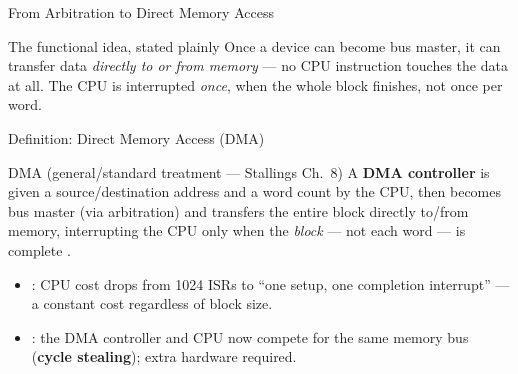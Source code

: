 \documentclass[aspectratio=169]{beamer}
\begin{document}
\begin{frame}{From Arbitration to Direct Memory Access}
  \begin{block}{The functional idea, stated plainly}
    Once a device can become bus master, it can transfer data \emph{directly
    to or from memory} --- no CPU instruction touches the data at all. The
    CPU is interrupted \emph{once}, when the whole block finishes, not once
    per word.
  \end{block}
\end{frame}

\begin{frame}{Definition: Direct Memory Access (DMA)}
  \begin{block}{DMA (general/standard treatment --- Stallings Ch.~8)}
    A \textbf{DMA controller} is given a source/destination address and a
    word count by the CPU, then becomes bus master (via arbitration) and
    transfers the entire block directly to/from memory, interrupting the CPU
    only when the \emph{block} --- not each word --- is complete
    \cite{Stallings2015_computer_organization}.
  \end{block}
  \begin{itemize}
    \item {}: CPU cost drops from 1024 ISRs to ``one setup, one
      completion interrupt'' --- a constant cost regardless of block size.
    \item {}: the DMA controller and CPU now compete for the same
      memory bus (\textbf{cycle stealing}); extra hardware required.
  \end{itemize}
\end{frame}
\end{document}
